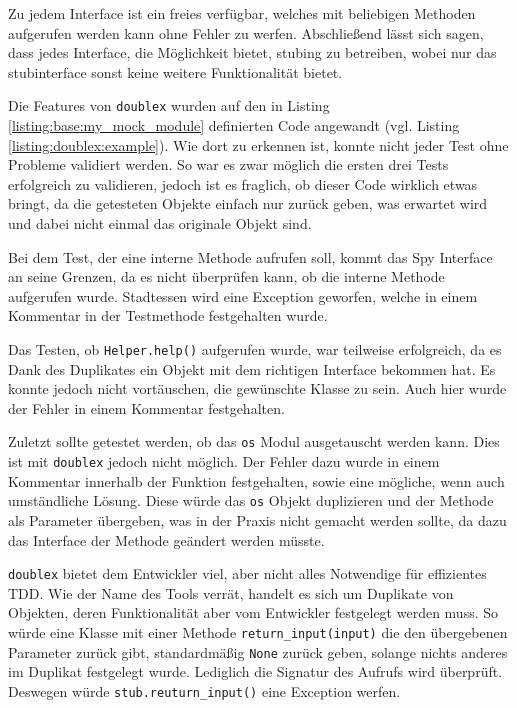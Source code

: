 Zu jedem Interface ist ein freies verfügbar, welches mit beliebigen
Methoden aufgerufen werden kann ohne Fehler zu werfen. Abschließend lässt sich
sagen, dass jedes Interface, die Möglichkeit bietet,
\gls{stub}ing zu betreiben, wobei nur das \Gls{stub}interface sonst keine
weitere Funktionalität bietet.
\newline

Die Features von \lstinline{doublex} wurden auf den in Listing
\ref{listing:base:my_mock_module} definierten Code angewandt (vgl. Listing
\ref{listing:doublex:example}). Wie dort zu erkennen ist, konnte nicht jeder
Test ohne Probleme validiert werden. So war es zwar möglich die ersten drei
Tests erfolgreich zu validieren, jedoch ist es fraglich, ob dieser Code
wirklich etwas bringt, da die getesteten Objekte einfach nur zurück geben, was
erwartet wird und dabei nicht einmal das originale Objekt sind.

Bei dem Test, der eine interne Methode aufrufen soll, kommt das Spy Interface an
seine Grenzen, da es nicht überprüfen kann, ob die interne Methode aufgerufen
wurde. Stadtessen wird eine Exception geworfen, welche in einem
Kommentar in der Testmethode festgehalten wurde.

Das Testen, ob \lstinline{Helper.help()} aufgerufen wurde, war teilweise
erfolgreich, da es Dank des Duplikates ein Objekt mit dem richtigen Interface
bekommen hat. Es konnte jedoch nicht vortäuschen, die gewünschte Klasse zu sein.
Auch hier wurde der Fehler in einem Kommentar festgehalten.

Zuletzt sollte getestet werden, ob das \lstinline{os} Modul ausgetauscht werden
kann. Dies ist mit \lstinline{doublex} jedoch nicht möglich. Der Fehler
dazu wurde in einem Kommentar innerhalb der Funktion festgehalten, sowie eine
mögliche, wenn auch umständliche Lösung.
Diese würde das \lstinline{os} Objekt duplizieren und der Methode als
Parameter übergeben, was in der Praxis nicht gemacht werden
sollte, da dazu das Interface der Methode geändert werden müsste.
\newline

\lstinline{doublex} bietet dem Entwickler viel, aber nicht alles Notwendige für 
effizientes TDD. Wie der Name des Tools verrät, handelt es sich um Duplikate 
von Objekten, deren Funktionalität aber vom Entwickler festgelegt werden muss. 
So würde eine Klasse mit einer Methode \lstinline{return_input(input)} die den 
übergebenen Parameter zurück gibt, standardmäßig \lstinline{None} zurück geben, 
solange nichts anderes im Duplikat festgelegt wurde. Lediglich die Signatur des 
Aufrufs wird überprüft. Deswegen würde \lstinline{stub.reuturn_input()} eine 
Exception werfen.

